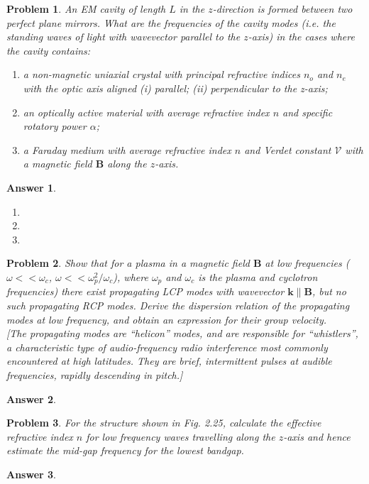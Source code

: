 \documentclass[a4paper]{article}
\newtheorem{ans}{Answer}[section]
\theoremstyle{new}
\newtheorem{qns}{Problem}[section]
\begin{document}
\begin{qns}
An EM cavity of length $L$ in the $z$-direction is formed between two perfect plane mirrors. What are the frequencies of the cavity modes (i.e. the standing waves of light with wavevector parallel to the $z$-axis) in the cases where the cavity contains:
\begin{enumerate}[label=(\alph*)]
\item a non-magnetic uniaxial crystal with principal refractive indices $n_o$ and $n_e$ with the optic axis aligned (i) parallel; (ii) perpendicular to the z-axis;
\item an optically active material with average refractive index $n$ and specific rotatory power $\alpha$;
\item a Faraday medium with average refractive index $n$ and Verdet constant $\mathcal{V}$ with a magnetic field $\mathbf{B}$ along the $z$-axis.
\end{enumerate}
\end{qns}
\begin{ans}\leavevmode
\begin{enumerate}[label=(\alph*)]
\item 

\item 

\item 

\end{enumerate}
\end{ans}
\begin{qns}
Show that for a plasma in a magnetic field $\mathbf{B}$ at low frequencies ($\omega<<\omega_c$, $\omega<<\omega_p^2/\omega_c$), where $\omega_p$ and $\omega_c$ is the plasma and cyclotron frequencies) there exist propagating LCP modes with wavevector $\mathbf{k}\parallel\mathbf{B}$, but no such propagating RCP modes. Derive the dispersion relation of the propagating modes at low frequency, and obtain an expression for their group velocity.\\[5pt]
[The propagating modes are “helicon” modes, and are responsible for “whistlers”, a characteristic type of audio-frequency radio interference most commonly encountered at high latitudes. They are brief, intermittent pulses at audible frequencies, rapidly descending in pitch.]
\end{qns}
\begin{ans}

\end{ans}
\begin{qns}
For the structure shown in Fig. 2.25, calculate the effective refractive index $n$ for low frequency waves travelling along the $z$-axis and hence estimate the mid-gap frequency for the lowest bandgap.
\end{qns}
\begin{ans}

\end{ans}
\newpage
\end{document}
